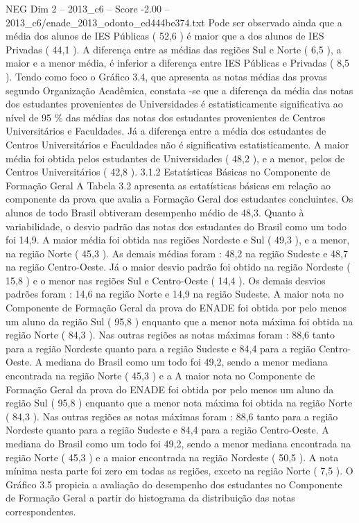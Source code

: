 \begin{textsample}{NEG Dim 2 – 2013\_c6 – Score -2.00 – 2013\_c6/enade\_2013\_odonto\_ed444be374.txt}
Pode ser observado ainda que a média dos alunos de IES Públicas ( 52,6 ) é maior que a dos alunos de IES Privadas ( 44,1 ).
A diferença entre as médias das regiões Sul e Norte ( 6,5 ), a maior e a menor média, é inferior a diferença entre IES Públicas e Privadas ( 8,5 ).
Tendo como foco o Gráfico 3.4, que apresenta as notas médias das provas segundo Organização Acadêmica, constata -se que a diferença da média das notas dos estudantes provenientes de Universidades é estatisticamente significativa ao nível de 95 \% das médias das notas dos estudantes provenientes de Centros Universitários e Faculdades.
Já a diferença entre a média dos estudantes de Centros Universitários e Faculdades não é significativa estatisticamente.
A maior média foi obtida pelos estudantes de Universidades ( 48,2 ), e a menor, pelos de Centros Universitários ( 42,8 ). 3.1.2 Estatísticas Básicas no Componente de Formação Geral A Tabela 3.2 apresenta as estatísticas básicas em relação ao componente da prova que avalia a Formação Geral dos estudantes concluintes.
Os alunos de todo Brasil obtiveram desempenho médio de 48,3.
Quanto à variabilidade, o desvio padrão das notas dos estudantes do Brasil como um todo foi 14,9.
A maior média foi obtida nas regiões Nordeste e Sul ( 49,3 ), e a menor, na região Norte ( 45,3 ).
As demais médias foram : 48,2 na região Sudeste e 48,7 na região Centro-Oeste.
Já o maior desvio padrão foi obtido na região Nordeste ( 15,8 ) e o menor nas regiões Sul e Centro-Oeste ( 14,4 ).
Os demais desvios padrões foram : 14,6 na região Norte e 14,9 na região Sudeste.
A maior nota no Componente de Formação Geral da prova do ENADE foi obtida por pelo menos um aluno da região Sul ( 95,8 ) enquanto que a menor nota máxima foi obtida na região Norte ( 84,3 ).
Nas outras regiões as notas máximas foram : 88,6 tanto para a região Nordeste quanto para a região Sudeste e 84,4 para a região Centro-Oeste.
A mediana do Brasil como um todo foi 49,2, sendo a menor mediana encontrada na região Norte ( 45,3 ) e a A maior nota no Componente de Formação Geral da prova do ENADE foi obtida por pelo menos um aluno da região Sul ( 95,8 ) enquanto que a menor nota máxima foi obtida na região Norte ( 84,3 ).
Nas outras regiões as notas máximas foram : 88,6 tanto para a região Nordeste quanto para a região Sudeste e 84,4 para a região Centro-Oeste.
A mediana do Brasil como um todo foi 49,2, sendo a menor mediana encontrada na região Norte ( 45,3 ) e a maior encontrada na região Nordeste ( 50,5 ).
A nota mínima nesta parte foi zero em todas as regiões, exceto na região Norte ( 7,5 ).
O Gráfico 3.5 propicia a avaliação do desempenho dos estudantes no Componente de Formação Geral a partir do histograma da distribuição das notas correspondentes.

\end{textsample}
